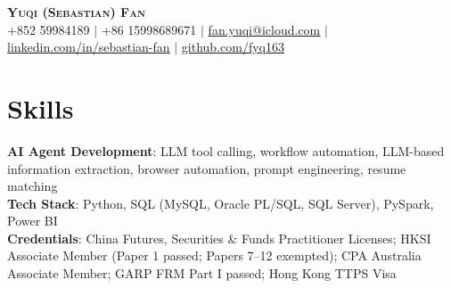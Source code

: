 \documentclass[a4paper,11pt]{article}
\begin{document}

\begin{center}
    \textbf{\Huge \scshape Yuqi (Sebastian) Fan} \\ \vspace{0pt}
     \small +852 59984189  $|$  +86 15998689671
    $|$ \href{mailto:fan.yuqi@icloud.com}{\underline{fan.yuqi@icloud.com}} 
    $|$ 
    \href{https://linkedin.com/in/sebastian-fan}{\underline{linkedin.com/in/sebastian-fan}} $|$
    \href{https://github.com/fyq163}{\underline{github.com/fyq163}}
\end{center}
\vspace{-0.5\baselineskip} %
%
\section{Skills}
 \begin{itemize}[leftmargin=0.25in, label={}]
    \small{\item{
     \textbf{AI Agent Development}{: LLM tool calling, workflow automation, LLM-based information extraction, browser automation, prompt engineering, resume matching} \\

     \textbf{Tech Stack}{: Python, SQL (MySQL, Oracle PL/SQL, SQL Server), PySpark, Power BI} \\

     \textbf{Credentials}{: China Futures, Securities \& Funds Practitioner Licenses; HKSI Associate Member (Paper 1 passed; Papers 7--12 exempted); CPA Australia Associate Member; GARP FRM Part I passed; Hong Kong TTPS Visa} \\

     
    }}
    \vspace{-3pt}
 \end{itemize}
 
\end{document}
